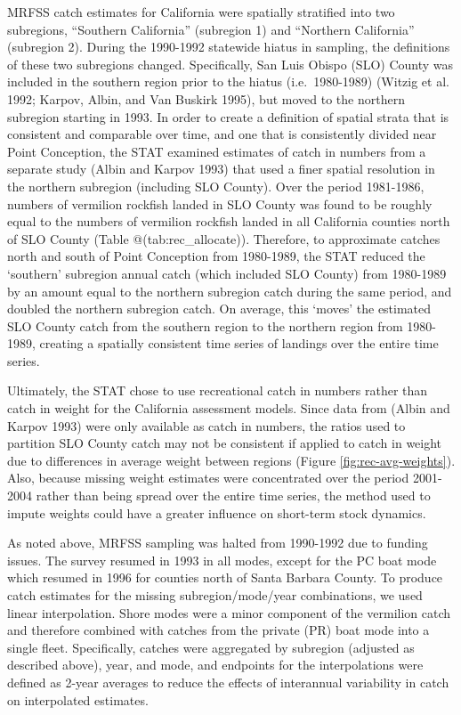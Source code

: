 \documentclass[
  english,
  a4paper,
]{article}
\begin{document}
MRFSS catch estimates for California were spatially stratified into two subregions,
``Southern California'' (subregion 1) and ``Northern California'' (subregion 2).
During the 1990-1992 statewide hiatus in sampling, the definitions of these two
subregions changed. Specifically, San Luis Obispo (SLO) County was included in
the southern region prior to the hiatus (i.e.~1980-1989) (Witzig et al. 1992; Karpov, Albin, and Van Buskirk 1995),
but moved to the northern subregion starting in 1993. In order to create a
definition of spatial strata that is consistent and comparable over time, and
one that is consistently divided near Point Conception, the STAT examined
estimates of catch in numbers from a separate study (Albin and Karpov 1993) that used a finer spatial
resolution in the northern subregion (including SLO County). Over the period
1981-1986, numbers of vermilion rockfish landed in SLO County was found to
be roughly equal to the numbers of vermilion rockfish landed in all California
counties north of SLO County (Table @(tab:rec\_allocate)). Therefore, to approximate catches north
and south of Point Conception from 1980-1989, the STAT reduced the `southern'
subregion annual catch (which included SLO County) from 1980-1989 by an amount
equal to the northern subregion catch during the same period, and doubled the
northern subregion catch. On average, this `moves' the estimated SLO County
catch from the southern region to the northern region from 1980-1989, creating
a spatially consistent time series of landings over the entire time series.

Ultimately, the STAT chose to use recreational catch in numbers rather than catch in weight for the California assessment models. Since data from (Albin and Karpov 1993) were only available as catch in numbers, the ratios used to partition SLO County catch may not be consistent if applied to catch in weight due to differences in average weight between regions (Figure \ref{fig:rec-avg-weights}). Also, because missing weight estimates were concentrated over the period 2001-2004 rather than being spread over the entire time series, the method used to impute weights could have a greater influence on short-term stock dynamics.

As noted above, MRFSS sampling was halted from 1990-1992 due to funding issues.
The survey resumed in 1993 in all modes, except for the PC boat
mode which resumed in 1996 for counties north of Santa Barbara County. To
produce catch estimates for the missing subregion/mode/year combinations, we
used linear interpolation. Shore modes were a minor component of the vermilion
catch and therefore combined with catches from the private (PR) boat mode into
a single fleet. Specifically, catches were aggregated by subregion (adjusted as
described above), year, and mode, and endpoints for the interpolations were
defined as 2-year averages to reduce the effects of interannual variability
in catch on interpolated estimates.
\end{document}
